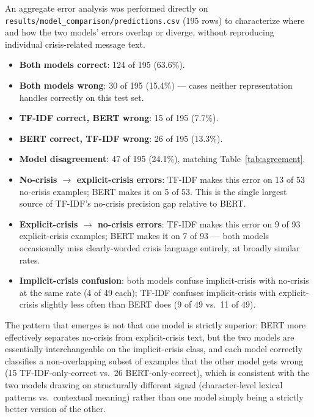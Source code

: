 An aggregate error analysis was performed directly on \texttt{results/\pbrk model\_\pbrk comparison/\pbrk predictions.csv} (195 rows) to characterize where and how the two models' errors overlap or diverge, without reproducing individual crisis-related message text.

\begin{itemize}[nosep]
  \item \textbf{Both models correct}: 124 of 195 (63.6\%).
  \item \textbf{Both models wrong}: 30 of 195 (15.4\%) --- cases neither representation handles correctly on this test set.
  \item \textbf{TF-IDF correct, BERT wrong}: 15 of 195 (7.7\%).
  \item \textbf{BERT correct, TF-IDF wrong}: 26 of 195 (13.3\%).
  \item \textbf{Model disagreement}: 47 of 195 (24.1\%), matching Table~\ref{tab:agreement}.
  \item \textbf{No-crisis $\rightarrow$ explicit-crisis errors}: TF-IDF makes this error on 13 of 53 no-crisis examples; BERT makes it on 5 of 53. This is the single largest source of TF-IDF's no-crisis precision gap relative to BERT.
  \item \textbf{Explicit-crisis $\rightarrow$ no-crisis errors}: TF-IDF makes this error on 9 of 93 explicit-crisis examples; BERT makes it on 7 of 93 --- both models occasionally miss clearly-worded crisis language entirely, at broadly similar rates.
  \item \textbf{Implicit-crisis confusion}: both models confuse implicit-crisis with no-crisis at the same rate (4 of 49 each); TF-IDF confuses implicit-crisis with explicit-crisis slightly less often than BERT does (9 of 49 vs.\ 11 of 49).
\end{itemize}

The pattern that emerges is not that one model is strictly superior: BERT more effectively separates no-crisis from explicit-crisis text, but the two models are essentially interchangeable on the implicit-crisis class, and each model correctly classifies a non-overlapping subset of examples that the other model gets wrong (15 TF-IDF-only-correct vs.\ 26 BERT-only-correct), which is consistent with the two models drawing on structurally different signal (character-level lexical patterns vs.\ contextual meaning) rather than one model simply being a strictly better version of the other.

